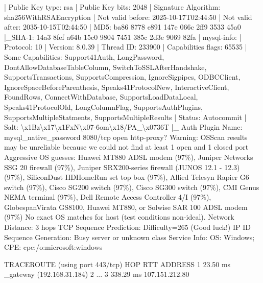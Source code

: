 \documentclass[
]{article}
\newenvironment{Shaded}{}{}
\newcommand{\NormalTok}[1]{#1}
\begin{document}
\begin{Shaded}
\begin{Highlighting}[]
\NormalTok{| Public Key type: rsa}
\NormalTok{| Public Key bits: 2048}
\NormalTok{| Signature Algorithm: sha256WithRSAEncryption}
\NormalTok{| Not valid before: 2025{-}10{-}17T02:44:50}
\NormalTok{| Not valid after:  2035{-}10{-}15T02:44:50}
\NormalTok{| MD5:   ba86 8778 e891 147e 066c 2ff9 3533 45a0}
\NormalTok{|\_SHA{-}1: 14a3 8fef a64b 15c0 9804 7451 385c 2d3e 9069 82fa}
\NormalTok{| mysql{-}info:}
\NormalTok{|   Protocol: 10}
\NormalTok{|   Version: 8.0.39}
\NormalTok{|   Thread ID: 233900}
\NormalTok{|   Capabilities flags: 65535}
\NormalTok{|   Some Capabilities: Support41Auth, LongPassword, DontAllowDatabaseTableColumn, SwitchToSSLAfterHandshake, SupportsTransactions, SupportsCompression, IgnoreSigpipes, ODBCClient, IgnoreSpaceBeforeParenthesis, Speaks41ProtocolNew, InteractiveClient, FoundRows, ConnectWithDatabase, SupportsLoadDataLocal, Speaks41ProtocolOld, LongColumnFlag, SupportsAuthPlugins, SupportsMultipleStatments, SupportsMultipleResults}
\NormalTok{|   Status: Autocommit}
\NormalTok{|   Salt: \textbackslash{}x1Bz\textbackslash{}x17\textbackslash{}x1FxN\textbackslash{}x07{-}6om\textbackslash{}x18/PA\_\textbackslash{}x0736T}
\NormalTok{|\_  Auth Plugin Name: mysql\_native\_password}
\NormalTok{8080/tcp open  http{-}proxy?}
\NormalTok{Warning: OSScan results may be unreliable because we could not find at least 1 open and 1 closed port}
\NormalTok{Aggressive OS guesses: Huawei MT880 ADSL modem (97\%), Juniper Networks SSG 20 firewall (97\%), Juniper SRX200{-}series firewall (JUNOS 12.1 {-} 12.3) (97\%), SiliconDust HDHomeRun set top box (97\%), Allied Telesyn Rapier G6 switch (97\%), Cisco SG200 switch (97\%), Cisco SG300 switch (97\%), CMI Genus NEMA terminal (97\%), Dell Remote Access Controller 4/I (97\%), GlobespanVirata GS8100, Huawei MT880, or Solwise SAR 100 ADSL modem (97\%)}
\NormalTok{No exact OS matches for host (test conditions non{-}ideal).}
\NormalTok{Network Distance: 3 hops}
\NormalTok{TCP Sequence Prediction: Difficulty=265 (Good luck!)}
\NormalTok{IP ID Sequence Generation: Busy server or unknown class}
\NormalTok{Service Info: OS: Windows; CPE: cpe:/o:microsoft:windows}

\NormalTok{TRACEROUTE (using port 443/tcp)}
\NormalTok{HOP RTT       ADDRESS}
\NormalTok{1   23.50 ms  \_gateway (192.168.31.184)}
\NormalTok{2   ...}
\NormalTok{3   338.29 ms 107.151.212.80}


\end{Highlighting}
\end{Shaded}
\end{document}
